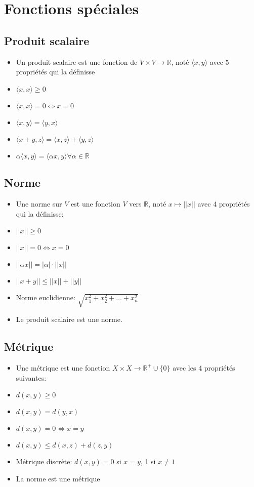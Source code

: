\documentclass[12pt]{book}
\let\Bbb\mathbb
\theoremstyle{definition}
\begin{document}
\section{Fonctions spéciales}
\subsection{Produit scalaire}
\begin{itemize}
    \item Un produit scalaire est une fonction de $V \times V \to \Bbb R$, noté $\langle x, y \rangle$ avec 5 propriétés qui la définisse
    \item $\langle x, x \rangle \geq 0$
    \item $\langle x, x \rangle = 0 \iff x = 0$
    \item $\langle x, y \rangle = \langle y, x \rangle$
    \item $\langle x + y, z\rangle = \langle x, z \rangle + \langle y, z \rangle$
    \item $\alpha\langle x, y \rangle = \langle \alpha x, y \rangle \forall \alpha \in \Bbb R$
\end{itemize}
\subsection{Norme}
\begin{itemize}
    \item Une norme sur $V$ est une fonction $V$ vers $\Bbb R$, noté $x \mapsto ||x||$ avec 4 propriétés qui la définisse:
    \item $||x|| \geq 0$
    \item $||x|| = 0 \iff x = 0$
    \item $||\alpha x|| = |\alpha| \cdot ||x||$
    \item $||x + y || \leq ||x|| + ||y||$
    \item Norme euclidienne: $\sqrt{x_1^2 + x_2^2 + \dots + x_n^2}$
    \item Le produit scalaire est une norme.
\end{itemize}
\subsection{Métrique}
\begin{itemize}
    \item Une métrique est une fonction $X \times X \to \Bbb R^+ \cup \{0\}$ avec les 4 propriétés suivantes:
    \item $d(x,y) \geq 0$
    \item $d(x,y) = d(y, x)$
    \item $d(x,y) = 0 \iff x = y$
    \item $d(x,y) \leq d(x, z) + d(z, y)$
    \item Métrique discrète: $d(x,y) = 0$ si $x = y$, 1 si $x \neq 1$
    \item La norme est une métrique
\end{itemize}
\end{document}
